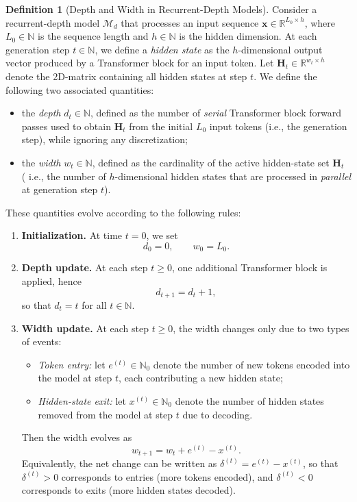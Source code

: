 \documentclass{article} %
\theoremstyle{definition}
\newtheorem{definition}[theorem]{Definition}
\theoremstyle{plain}
\begin{document}
\begin{definition}[Depth and Width in Recurrent-Depth Models]
Consider a recurrent-depth model $\mathcal{M}_{d}$ that processes an input sequence $\mathbf{x} \in \mathbb{R}^{L_0 \times h}$, where $L_0 \in \mathbb{N}$ is the sequence length and $h \in \mathbb{N}$ is the hidden dimension. At each generation step $t \in \mathbb{N}$, we define a \emph{hidden state} as the $h$-dimensional output vector produced by a Transformer block for an input token. Let $\mathbf{H}_t \in \mathbb{R}^{w_t \times h}$ denote the 2D-matrix containing all hidden states at step $t$. We define the following two associated quantities:

\begin{itemize}[itemsep=1pt,topsep=0pt,leftmargin=*]
\item the \emph{depth} $d_t \in \mathbb{N}$, defined as the number of \emph{serial} 
Transformer block forward passes used to obtain $\mathbf{H}_t$ from the initial $L_0$ input tokens 
(i.e., the generation step), while ignoring any discretization;
\item the \emph{width} $w_t \in \mathbb{N}$, defined as the cardinality of the active hidden-state set 
$\mathbf{H}_t$ ( i.e., the number of $h$-dimensional hidden states that are processed in \emph{parallel}
at generation step $t$).
\end{itemize}
These quantities evolve according to the following rules:
\begin{enumerate}[itemsep=1pt,topsep=0pt,leftmargin=*]
\item \textbf{Initialization.} At time $t=0$, we set
\[
d_0 = 0, \qquad w_0 = L_0.
\]
\item \textbf{Depth update.} At each step $t \ge 0$, one additional Transformer block is applied, hence
\[
d_{t+1} = d_t + 1,
\]
so that $d_t = t$ for all $t \in \mathbb{N}$.
\item \textbf{Width update.} 
At each step $t \ge 0$, the width changes only due to two types of events:
\begin{itemize}[itemsep=0pt,topsep=0pt,leftmargin=*]
  \item \emph{Token entry:} let $e^{(t)} \in \mathbb{N}_0$ denote the number of new tokens encoded 
  into the model at step $t$, each contributing a new hidden state;
  \item \emph{Hidden-state exit:} let $x^{(t)} \in \mathbb{N}_0$ denote the number of hidden states 
  removed from the model at step $t$ due to decoding.
\end{itemize}
Then the width evolves as
\[
w_{t+1} = w_t + e^{(t)} - x^{(t)}.
\]
Equivalently, the net change can be written as $\delta^{(t)} = e^{(t)} - x^{(t)}$, 
so that $\delta^{(t)} > 0$ corresponds to entries (more tokens encoded), 
and $\delta^{(t)} < 0$ corresponds to exits (more hidden states decoded).
\end{enumerate}
\end{definition}
\end{document}
